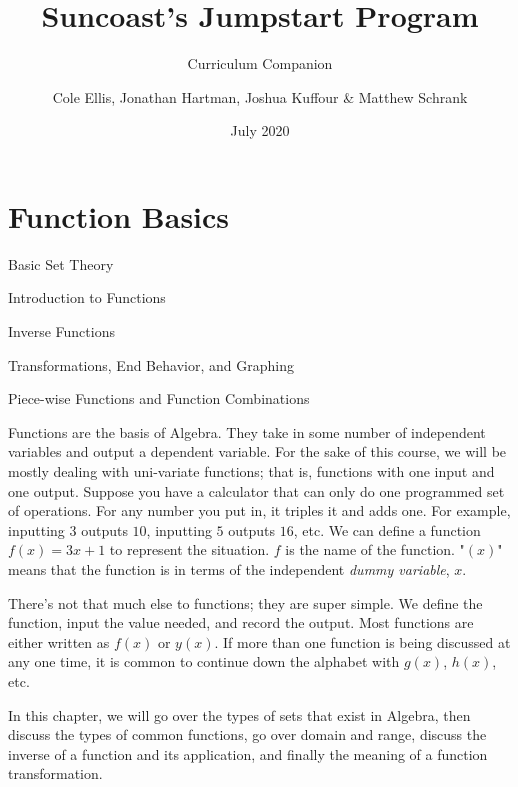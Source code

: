 \documentclass[lang=en,11pt]{elegantbook}
\title{Suncoast's Jumpstart Program}
\subtitle{Curriculum Companion}
\author{Cole Ellis, Jonathan Hartman, Joshua Kuffour \& Matthew Schrank}
\institute{Suncoast High School}
\date{July 2020}
\begin{document}
\maketitle

\frontmatter
\tableofcontents

\mainmatter



\chapter{Function Basics}
\begin{introduction}[Contents]
\item Basic Set Theory
\item Introduction to Functions
\item Inverse Functions
\item Transformations, End Behavior, and Graphing
\item Piece-wise Functions and Function Combinations
\end{introduction}
Functions are the basis of Algebra.  They take in some number of independent variables and output a dependent variable.  For the sake of this course, we will be mostly dealing with uni-variate functions; that is, functions with one input and one output.  Suppose you have a calculator that can only do one programmed set of operations.  For any number you put in, it triples it and adds one.  For example, inputting $3$ outputs $10$, inputting $5$ outputs $16$, etc.  We can define a function $f(x)=3x+1$ to represent the situation.  $f$ is the name of the function.  "$(x)$" means that the function is in terms of the independent \textit{dummy variable}, $x$.

There's not that much else to functions; they are super simple.  We define the function, input the value needed, and record the output.  Most functions are either written as $f(x)$ or $y(x)$.  If more than one function is being discussed at any one time, it is common to continue down the alphabet with $g(x)$, $h(x)$, etc.

In this chapter, we will go over the types of sets that exist in Algebra, then discuss the types of common functions, go over domain and range, discuss the inverse of a function and its application, and finally the meaning of a function transformation.
\end{document}
